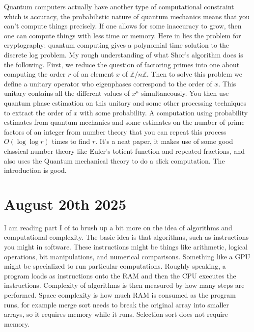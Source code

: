 \documentclass{amsart}
\theoremstyle{definition}
\begin{document}
Quantum computers actually have another type of computational constraint which is accuracy, the probabilistic nature of quantum mechanics means that you can't compute things precisely. If one allows for some inaccuracy to grow, then one can compute things with less time or memory. Here in lies the problem for cryptography: quantum computing gives a polynomial time solution to the discrete log problem. My rough understanding of what Shor's algorithm does is the following. First, we reduce the question of factoring primes into one about computing the order $r$ of an element $x$ of $\mathbb{Z}/n\mathbb{Z}$. Then to solve this problem we define a unitary operator who eigenphases correspond to the order of $x$. This unitary contains all the different values of $x^a$ simultaneously. You then use quantum phase estimation on this unitary and some other processing techniques to extract the order of $x$ with some probability. A computation using probability estimates from quantum mechanics and some estimates on the number of prime factors of an integer from number theory that you can repeat this process $O(\log\log r )$ times to find $r$. It's a neat paper, it makes use of some good classical number theory like Euler's totient function and repeated fractions, and also uses the Quantum mechanical theory to do a slick computation. The introduction is good.

\section{August 20th 2025}

I am reading part I of \cite{Algorithms} to brush up a bit more on the idea of algorithms and computational complexity. The basic idea is that algorithms, such as instructions you might in software. These instructions might be things like arithmetic, logical operations, bit manipulations, and numerical comparisons. Something like a GPU might be specialized to run particular computations. Roughly speaking, a program loads as instructions onto the RAM and then the CPU executes the instructions. Complexity of algorithms is then measured by how many steps are performed. Space complexity is how much RAM is consumed as the program runs, for example merge sort needs to break the original array into smaller arrays, so it requires memory while it runs. Selection sort does not require memory.
\end{document}
